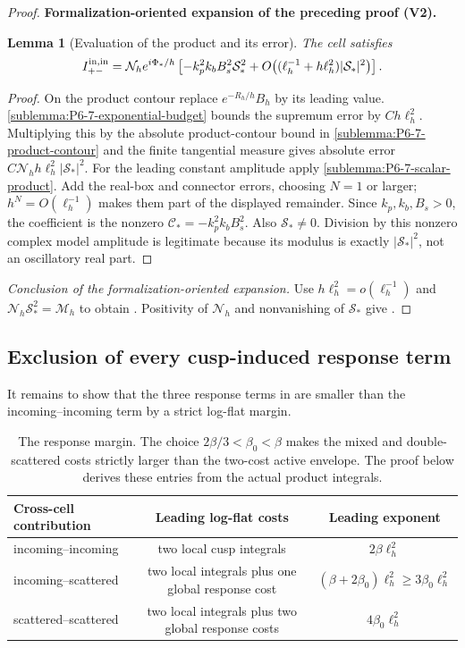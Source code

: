\documentclass[11pt]{article}
\newtheorem{lemma}[theorem]{Lemma}
\newcommand{\formalisationparentid}{X}
\newenvironment{formalisationaddition}[1]{\par\medskip\begingroup\color{blue}\def\formalisationparentid{#1}\setcounter{formalizationsublemma}{0}\let\lemma\formalizationsublemma\let\endlemma\endformalizationsublemma
  \def\Eo{\mathcal E_h^\circ}\def\EE{\mathcal E_h}\def\phio{\phi_h^\circ}\def\phih{\phi_h}\def\Ho{H_h^{\rm atom}(v^\circ)}\def\Ha{H_h^{\rm atom}}\def\HL{H_h^{L}}\def\Dh{D_h}\def\Log{\operatorname{Log}}\def\ellh{\ell_h}\def\Gp{G_{p,h}}\def\Ast{A_{*,h}}\def\ahat{\widehat{\mathfrak a}_h}\def\ah{\mathfrak a_h}\def\rh{\widehat\rho_h}\def\deltah{\widehat\delta_h}\def\oldref##1{\textup{(##1)}}\def\interface##1{\par\noindent\textit{Analytical interface used here.} ##1\par}\def\finish{\par\noindent\textit{Conclusion of the formalization-oriented expansion.} }\par\noindent\textbf{Formalization-oriented expansion of the preceding proof (V2).}\par\smallskip
}{\par\endgroup\medskip
}
\begin{document}
\begin{proof}
\begin{formalisationaddition}{P6.7}
\begin{lemma}[Evaluation of the product and its error]\label{sublemma:P6-7-evaluation}
The cell satisfies
\[
 I_{+-}^{\rm in,in}
 =\mathcal N_he^{i\Phi_*/h}\left[
 -k_p^2k_bB_s^2\mathcal S_*^2
 +O\bigl((\ell_h^{-1}+h\ell_h^2)|\mathcal S_*|^2\bigr)\right].
\]
\end{lemma}
\begin{proof}
On the product contour replace $e^{-R_h/h}B_h$ by its leading value.
\ref{sublemma:P6-7-exponential-budget} bounds the supremum error by
$Ch\ell_h^2$. Multiplying this by the absolute product-contour bound
in \ref{sublemma:P6-7-product-contour} and the finite tangential measure
gives absolute error
$C\mathcal N_hh\ell_h^2|\mathcal S_*|^2$.
For the leading constant amplitude apply
\ref{sublemma:P6-7-scalar-product}.
Add the real-box and connector errors, choosing $N=1$ or larger;
$h^N=O(\ell_h^{-1})$ makes them part of the displayed remainder.
Since $k_p,k_b,B_s>0$, the coefficient is the nonzero
$\mathscr C_*=-k_p^2k_bB_s^2$.
Also $\mathcal S_*\ne0$. Division by this nonzero complex model
amplitude is legitimate because its modulus is exactly
$|\mathcal S_*|^2$, not an oscillatory real part.
\end{proof}
\finish Use $h\ell_h^2=o(\ell_h^{-1})$ and
$\mathcal N_h\mathcal S_*^2=\mathcal M_h$ to obtain
. Positivity of $\mathcal N_h$ and
nonvanishing of $\mathcal S_*$ give .
\end{formalisationaddition}

\end{proof}

\subsection{Exclusion of every cusp-induced response term}\label{sec:scat-exclusion}
It remains to show that the three response terms in
 are smaller than the incoming--incoming term by
a strict log-flat margin.

\begin{table}[H]
\centering
\small
\begin{tabular}{lcc}
\toprule
Cross-cell contribution & Leading log-flat costs & Leading exponent\\
\midrule
incoming--incoming & two local cusp integrals & $2\beta\ell_h^2$\\
incoming--scattered & two local integrals plus one global response cost
& $(\beta+2\beta_0)\ell_h^2\ge3\beta_0\ell_h^2$\\
scattered--scattered & two local integrals plus two global response costs
& $4\beta_0\ell_h^2$\\
\bottomrule
\end{tabular}
\caption{The response margin.  The choice
$2\beta/3<\beta_0<\beta$ makes the mixed and double-scattered costs strictly
larger than the two-cost active envelope.  The proof below derives these
entries from the actual product integrals.}
\label{tab:response-costs}
\end{table}
\end{document}
